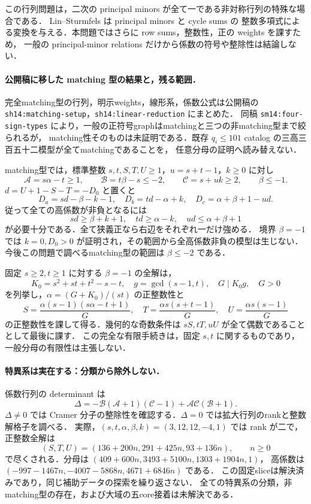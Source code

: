 この行列問題は，二次の principal minors が全て一である非対称行列の特殊な場合である．
Lin--Sturmfels\cite[\S2, Proposition~4]{LinSturmfels} は principal minors と cycle sums の
整数多項式による変換を与える．本問題ではさらに row sums，整数性，正の weights を課すため，
一般の principal-minor relations だけから係数の符号や整除性は結論しない．

\paragraph{公開稿に移した matching 型の結果と，残る範囲．}
完全matching型の行列，明示weights，線形系，係数公式は公開稿の
\texttt{sh14:matching-setup}，\texttt{sh14:linear-reduction} にまとめた．
同稿 \texttt{sm14:four-sign-types} により，一般の正符号graphはmatchingと三つの非matching型まで絞られるが，
matching性そのものは未証明である．既存 $q_i\leq101$ catalog の三高三百五十二模型が全てmatchingであることを，
任意分母の証明へ読み替えない．

matching型では，標準整数 $s,t,S,T,U\geq1$，$u=s+t-1$，$k\geq0$ に対し
\[
 \mathcal A=s\alpha-t\geq1,\qquad
 \mathcal B=t\beta-s\leq-2,\qquad
 \mathcal C=s+uk\geq2,\qquad \beta\leq-1.
\]
$d=U+1-S-T=-D_0$ と置くと
\[
 D_a=sd-\beta-k-1,\quad D_b=td-\alpha+k,\quad
 D_c=\alpha+\beta+1-ud.
\]
従って全ての高係数が非負となるには
\[
 sd\geq\beta+k+1,\quad td\geq\alpha-k,\quad
 ud\leq\alpha+\beta+1
\]
が必要十分である．全て狭義正なら右辺をそれぞれ一だけ強める．
境界 $\beta=-1$ では $k=0,D_0>0$ が証明され，その範囲から全高係数非負の模型は生じない．
今後この問題で調べるmatching型の範囲は $\beta\leq-2$ である．

固定 $s\geq2,t\geq1$ に対する $\beta=-1$ の全解は，
\[
 K_0=s^2+st+t^2-s-t,\quad g=\gcd(s-1,t),\quad G\mid K_0g,\quad G>0
\]
を列挙し，$\alpha=(G+K_0)/(st)$ の正整数性と
\[
 S=\frac{\alpha(s-1)(s\alpha-t+1)}G,\quad
 T=\frac{\alpha s(s+t-1)}G,\quad
 U=\frac{\alpha s(s-1)}G
\]
の正整数性を課して得る．幾何的な奇数条件は $sS,tT,uU$ が全て偶数であることとして最後に課す．
この完全な有限手続きは，固定 $s,t$ に関するものであり，一般分母の有限性は主張しない．

\paragraph{特異系は実在する：分類から除外しない．}
係数行列の determinant は
\[
 \Delta=-\mathcal B(\mathcal A+1)(\mathcal C-1)
          +\mathcal A\mathcal C(\mathcal B+1).
\]
$\Delta\ne0$ では Cramer 分子の整除性を確認する．$\Delta=0$ では拡大行列のrankと整数解格子を調べる．
実際，$(s,t,\alpha,\beta,k)=(3,12,12,-4,1)$ では rank が二で，正整数全解は
\[
 (S,T,U)=(136+200n,291+425n,93+136n),\qquad n\geq0
\]
で尽くされる．分母は $(409+600n,3493+5100n,1303+1904n,1)$，
高係数は $(-997-1467n,-4007-5868n,4671+6846n)$ である．
この固定sliceは解決済みであり，同じ補助データの探索を繰り返さない．
全ての特異系の分類，非matching型の存在，および大域の五core接着は未解決である．

